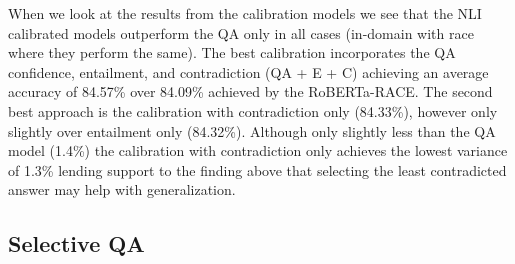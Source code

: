 \documentclass[11pt]{article}
\begin{document}
When we look at the results from the calibration models we see that the NLI calibrated models outperform the QA only in all cases (in-domain with race where they perform the same). The best calibration incorporates the QA confidence, entailment, and contradiction (QA + E + C) achieving an average accuracy of 84.57\% over 84.09\% achieved by the RoBERTa-RACE. The second best approach is the calibration with contradiction only (84.33\%), however only slightly over entailment only (84.32\%). Although only slightly less than the QA model (1.4\%) the calibration with contradiction only achieves the lowest variance of 1.3\% lending support to the finding above that selecting the least contradicted answer may help with generalization.
\subsection{Selective QA}
\end{document}

